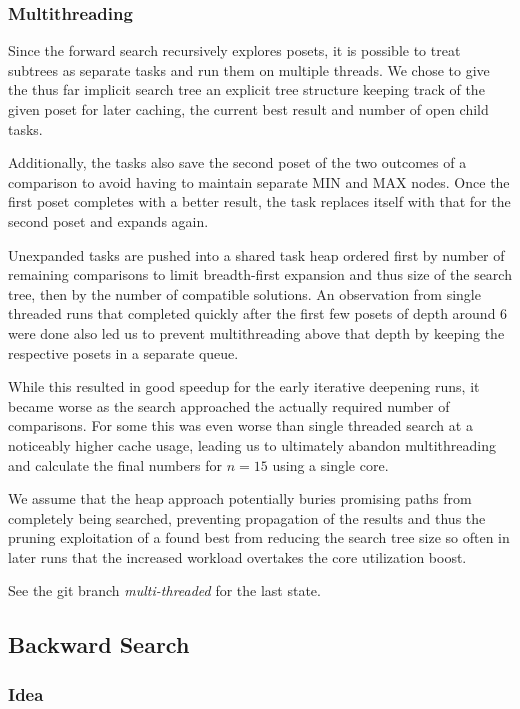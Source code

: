 \documentclass[10pt,journal,compsoc]{IEEEtran}
\begin{document}
\subsubsection{Multithreading}

Since the forward search recursively explores posets, it is possible to treat subtrees as separate tasks and run them on multiple threads.
We chose to give the thus far implicit search tree an explicit tree structure keeping track of the given poset for later caching, the current best result and number of open child tasks.

Additionally, the tasks also save the second poset of the two outcomes of a comparison to avoid having to maintain separate
MIN and MAX nodes. Once the first poset completes with a better result, the task replaces itself with that for the second poset and expands again.

Unexpanded tasks are pushed into a shared task heap ordered first by number of remaining comparisons to limit breadth-first expansion and thus size of the search tree, then by the number of compatible solutions.
An observation from single threaded runs that completed quickly after the first few posets of depth around $6$ were done also led us to prevent multithreading above that depth by keeping the respective posets in a separate queue.

While this resulted in good speedup for the early iterative deepening runs, it became worse as the search approached the actually required number of comparisons.
For some this was even worse than single threaded search at a noticeably higher cache usage, leading us to ultimately abandon multithreading and calculate the final numbers for $n = 15$ using a single core.

We assume that the heap approach potentially buries promising paths from completely being searched, preventing propagation of the results and thus the pruning exploitation of a found best from reducing the search tree size so often in later runs that the increased workload overtakes the core utilization boost.

See the git branch \textit{multi-threaded} for the last state.

\subsection{Backward Search} \label{sec:backward}

\subsubsection{Idea}
\end{document}
